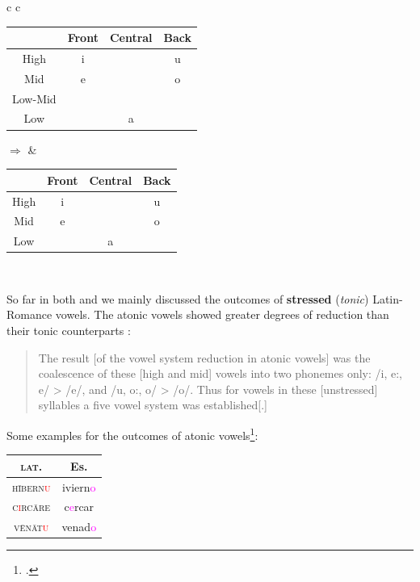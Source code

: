 \documentclass{report}[12pt]
\begin{document}
\begin{tcolorbox}
  \begin{tabular}{c c}
    \begin{tabular}{|c|c|c|c|}
      \hline
      & Front & Central & Back \\
      \hline
      High & i & & u \\
      \hline
      Mid & e & & o \\
      \hline
      Low-Mid & \cellcolor{gray} \textipa{E} & & \cellcolor{gray} \textipa{O} \\
      \hline
      Low & & a & \\
      \hline
    \end{tabular} \quad $\Rightarrow$ & 
                                        \begin{tabular}{|c|c|c|c|}
                                          \hline
                                          & Front & Central & Back \\
                                          \hline
                                          High & i & & u \\
                                          \hline
                                          Mid & \cellcolor{magenta} e & & \cellcolor{magenta} o \\
                                          \hline
                                          Low & & a & \\
                                          \hline
                                        \end{tabular} \\
  \end{tabular} 
\end{tcolorbox}

So far in both  and  we mainly discussed the outcomes of \textbf{stressed} (\emph{tonic}) Latin-Romance vowels. The atonic vowels showed greater degrees of reduction than their tonic counterparts \parencite[p.~113]{lloyd_spanish}:
\begin{quote}
  The result [of the vowel system reduction in atonic vowels] was the coalescence of these [high and mid] vowels into two phonemes only: /i, e:, e/ > /e/, and /u, o:, o/ > /o/. Thus for vowels in these [unstressed] syllables a five vowel system was established[.] 
\end{quote}
Some examples for the outcomes of atonic vowels\footcite[p.~113]{lloyd_spanish}:
\begin{center}
  \begin{tabular}{c c}
    \textsc{lat.} & Es. \\
    \hline
    \textsc{h\={i}bern\textcolor{red}{u}} & iviern\textcolor{magenta}{o} \\
    \textsc{c\textcolor{red}{i}rc\={a}re} & c\textcolor{magenta}{e}rcar \\
    \textsc{v\={e}n\={a}t\textcolor{red}{u}} & venad\textcolor{magenta}{o} \\
  \end{tabular}
\end{center}
\end{document}
